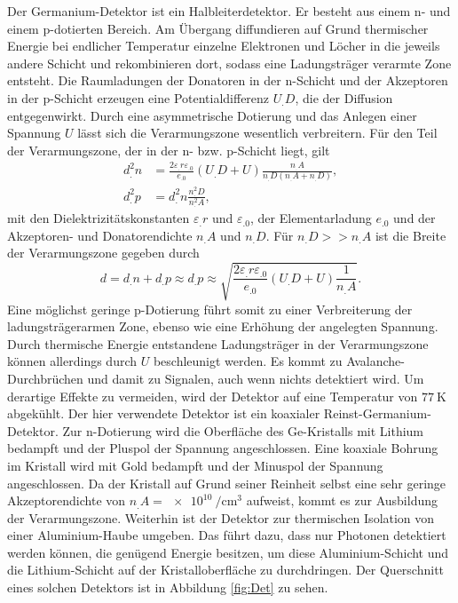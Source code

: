 Der Germanium-Detektor ist ein Halbleiterdetektor. Er besteht aus einem n- und einem p-dotierten Bereich. Am Übergang diffundieren auf Grund thermischer Energie bei endlicher Temperatur einzelne Elektronen und Löcher in die jeweils andere Schicht und rekombinieren dort, sodass eine Ladungsträger verarmte Zone entsteht. Die Raumladungen der Donatoren in der n-Schicht und der Akzeptoren in der p-Schicht erzeugen eine Potentialdifferenz $U_.D$, die der Diffusion entgegenwirkt.
Durch eine asymmetrische Dotierung und das Anlegen einer Spannung $U$ lässt sich die Verarmungszone wesentlich verbreitern.
Für den Teil der Verarmungszone, der in der n- bzw. p-Schicht liegt, gilt
\begin{align*}
d^2_.n&=\frac{2\varepsilon_.r\varepsilon_.0}{e_.0}\left(U_.D+U\right)\frac{n_.A}{n_.D\left(n_.A+n_.D\right)},\\
d^2_.p&=d^2_.n\frac{n^2_.D}{n^2_.A},
\end{align*}
mit den Dielektrizitätskonstanten $\varepsilon_.r$ und $\varepsilon_.0$, der Elementarladung $e_.0$ und der Akzeptoren- und Donatorendichte $n_.A$ und $n_.D$.
Für $n_.D>>n_.A$ ist die Breite der Verarmungszone gegeben durch
\begin{equation}
d=d_.n+d_.p\approx d_.p\approx\sqrt{\frac{2\varepsilon_.r\varepsilon_.0}{e_.0}\left(U_.D+U\right)\frac{1}{n_.A}}\text{.}
\end{equation}
Eine möglichst geringe p-Dotierung führt somit zu einer Verbreiterung der ladungsträgerarmen Zone, ebenso wie eine Erhöhung der angelegten Spannung. Durch thermische Energie entstandene Ladungsträger in der Verarmungszone können allerdings durch $U$ beschleunigt werden. Es kommt zu Avalanche-Durchbrüchen und damit zu Signalen, auch wenn nichts detektiert wird.
Um derartige Effekte zu vermeiden, wird der Detektor auf eine Temperatur von $\SI{77}{\kelvin}$ abgekühlt.
Der hier verwendete Detektor ist ein koaxialer Reinst-Germanium-Detektor. Zur n-Dotierung wird die Oberfläche des Ge-Kristalls mit Lithium bedampft und der Pluspol der Spannung angeschlossen.
Eine koaxiale Bohrung im Kristall wird mit Gold bedampft und der Minuspol der Spannung angeschlossen. Da der Kristall auf Grund seiner Reinheit selbst eine sehr geringe Akzeptorendichte von $n_.A=\SI{e10}{\per\cm^3}$ aufweist, kommt es zur Ausbildung der Verarmungszone. Weiterhin ist der Detektor zur thermischen Isolation von einer Aluminium-Haube umgeben. Das führt dazu, dass nur Photonen detektiert werden können, die genügend Energie besitzen, um diese Aluminium-Schicht und die Lithium-Schicht auf der Kristalloberfläche zu durchdringen. Der Querschnitt eines solchen Detektors ist in Abbildung \ref{fig:Det} zu sehen.
